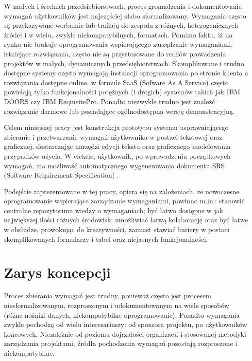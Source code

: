       W małych i średnich przedsiębiorstwach, proces gromadzenia i dokumentowania wymagań użytkowników jest najczęściej słabo sformalizowany. Wymagania często są przekazywane werbalnie lub trafiają do zespołu z różnych, heterogenicznych źródeł i w wielu, zwykle niekompatybilnych, formatach. Pomimo faktu, iż na rynku nie brakuje oprogramowania wspierającego zarządzanie wymaganiami, istniejące rozwiązania, często nie są przystosowane do realiów prowadzenia projektów w małych, dynamicznych przedsiębiorstwach. Skomplikowane i trudno dostępne systemy często wymagają instalacji oprogramowania po stronie klienta a rozwiązania dostępne online, w formule SaaS (Sofware As A Service) często powielają tylko funkcjonalności potężnych (i drogich) systemów takich jak IBM DOORS czy IBM ReqiusitePro. Ponadto niezwykle trudno jest znaleźć rozwiązanie darmowe lub posiadające ogólnodostępną wersję demonstracyjną. 

      Celem niniejszej pracy jest konstrukcja prototypu systemu usprawniającego zbieranie i przetwarzanie wymagań użytkownika w postaci tekstowej oraz graficznej, dostarczając narzędzi edycji tekstu oraz graficznego modelowania przypadków użycia. W efekcie, użytkownik, po wprowadzeniu początkowych wymagań, ma możliwość automatycznego wygenerowania dokumentu SRS (Software Requirement Specification) \cite{IEEE89}.
      
      Podejście zaprezentowane w tej pracy, opiera się na założeniach, że nowoczesne oprogramowanie wspierające zarządzanie wymaganiami, powinno m.in.: stanowić centralne repozytorium wiedzy o wymaganiach; być łatwo dostępne w jak największej ilości różnych środowisk; umożliwiać łatwą kolaborację oraz być łatwe w obsłudze, prowokując do kreatywności, zamiast stawiać bariery w postaci skomplikowanych formularzy i tabel oraz niejasnych funkcjonalności. 


    \section{Zarys koncepcji}

      Proces zbierania wymagań jest trudny, ponieważ często jest procesem niesformalizowanym, rozproszonym i udokumentowanym na wiele sposobów (różne nośniki danych, niekompatybilne oprogramowanie). Ponadto wymagania zwykle pochodzą od wielu interesariuszy: od sponsora projektu, po użytkowników końcowych. Niezależnie od poziomu dojrzałości organizacji i stosowanej metodyki zarządzania projektami, źródła pochodzenia wymagań pozostają rozproszone i niekompatybilne. 

